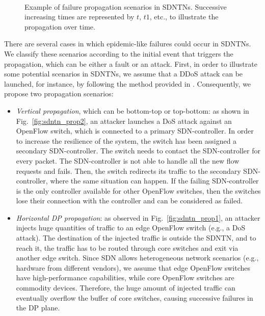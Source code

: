\documentclass[10pt,draftclsnofoot,onecolumn,journal]{IEEEtran}
\begin{document}
\begin{figure}
 \centering

\\

  \caption{Example of failure propagation scenarios in SDNTNs. Successive increasing times are represented by $t$, $t1$, etc., to illustrate the propagation over time.}
  \label{fig:sdntn_prop}
\end{figure}

There are several cases in which epidemic-like failures could occur in SDNTNs. We classify these scenarios according to the initial event that triggers the propagation, which can be either a fault or an attack. First, in order to illustrate some potential scenarios in SDNTNs, we assume that a DDoS attack can be launched, for instance, by following the method provided in \cite{attacking2013SDN}. Consequently, we propose two propagation scenarios:
\begin{itemize}
	\item \emph{Vertical propagation}, which can be bottom-top or top-bottom: as shown in Fig.~\ref{fig:sdntn_prop2}, an attacker launches a DoS attack against an OpenFlow switch, which is connected to a primary SDN-controller. In order to increase the resilience of the system, the switch has been assigned a secondary SDN-controller. The switch needs to contact the SDN-controller for every packet. The SDN-controller is not able to handle all the new flow requests and fails. Then, the switch redirects its traffic to the secondary SDN-controller, where the same situation can happen. If the failing SDN-controller is the only controller available for other OpenFlow switches, then the switches lose their connection with the controller and can be considered as failed.
	\item \emph{Horizontal DP propagation}: as observed in Fig.~\ref{fig:sdntn_prop1}, an attacker injects huge quantities of traffic to an edge OpenFlow switch (e.g., a DoS attack). The destination of the injected traffic is outside the SDNTN, and to reach it, the traffic has to be routed through core switches and exit via another edge switch. Since SDN allows heterogeneous network scenarios (e.g., hardware from different vendors), we assume that edge OpenFlow switches have high-performance capabilities, while core OpenFlow switches are commodity devices. Therefore, the huge amount of injected traffic can eventually overflow the buffer of core switches, causing successive failures in the DP plane.
\end{itemize}
\end{document}
